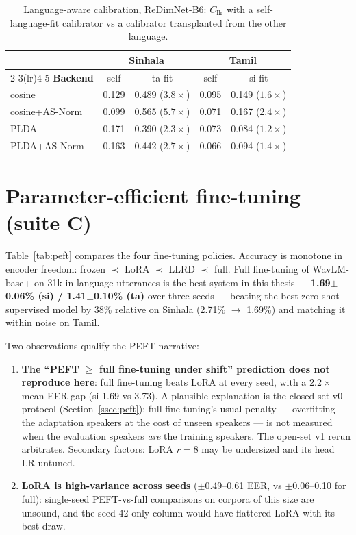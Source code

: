 \begin{table}[t]
\centering
\caption{Language-aware calibration, ReDimNet-B6:
$C_{\mathrm{llr}}$ with a self-language-fit calibrator vs a
calibrator transplanted from the other language.}
\label{tab:crosscal}
\begin{tabular}{lcccc}
\toprule
& \multicolumn{2}{c}{\textbf{Sinhala}} & \multicolumn{2}{c}{\textbf{Tamil}} \\
\cmidrule(lr){2-3}\cmidrule(lr){4-5}
\textbf{Backend} & self & ta-fit & self & si-fit \\
\midrule
cosine          & 0.129 & 0.489 ($3.8\times$) & 0.095 & 0.149 ($1.6\times$) \\
cosine+AS-Norm  & 0.099 & 0.565 ($5.7\times$) & 0.071 & 0.167 ($2.4\times$) \\
PLDA            & 0.171 & 0.390 ($2.3\times$) & 0.073 & 0.084 ($1.2\times$) \\
PLDA+AS-Norm    & 0.163 & 0.442 ($2.7\times$) & 0.066 & 0.094 ($1.4\times$) \\
\bottomrule
\end{tabular}
\end{table}

\section{Parameter-efficient fine-tuning (suite C)}
\label{sec:peft-results}

Table~\ref{tab:peft} compares the four fine-tuning policies.
Accuracy is monotone in encoder freedom: frozen $\prec$ LoRA
$\prec$ LLRD $\prec$ full. Full fine-tuning of WavLM-base+ on 31k
in-language utterances is the best system in this thesis —
\textbf{1.69$\pm$0.06\% (si) / 1.41$\pm$0.10\% (ta)} over three
seeds — beating the best zero-shot supervised model by 38\% relative
on Sinhala (2.71\% $\rightarrow$ 1.69\%) and matching it within noise
on Tamil.

Two observations qualify the PEFT narrative:

\begin{enumerate}
\item \textbf{The ``PEFT $\geq$ full fine-tuning under shift''
prediction \cite{sang2025unipet} does not reproduce here}: full
fine-tuning beats LoRA at every seed, with a $2.2\times$ mean EER
gap (si 1.69 vs 3.73). A plausible explanation is the closed-set v0
protocol (Section~\ref{ssec:peft}): full fine-tuning's usual
penalty — overfitting the adaptation speakers at the cost of unseen
speakers — is not measured when the evaluation speakers \emph{are}
the training speakers. The open-set v1 rerun arbitrates. Secondary
factors: LoRA $r{=}8$ may be undersized and its head LR untuned.
\item \textbf{LoRA is high-variance across seeds}
($\pm$0.49--0.61 EER, vs $\pm$0.06--0.10 for full): single-seed
PEFT-vs-full comparisons on corpora of this size are unsound, and
the seed-42-only column would have flattered LoRA with its best
draw.
\end{enumerate}

